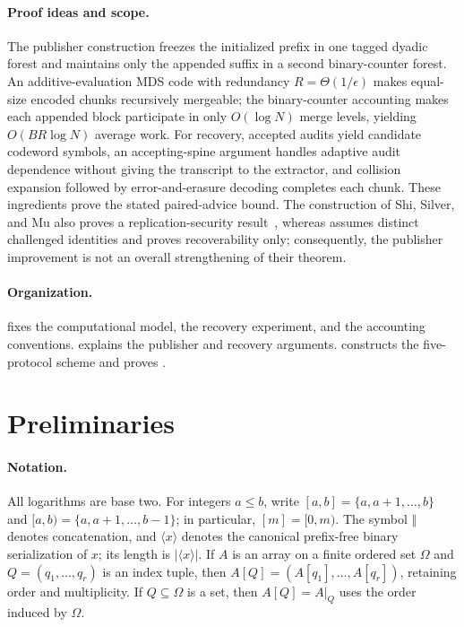 \documentclass[11pt]{article}
\begin{document}
\paragraph{Proof ideas and scope.}
The publisher construction freezes the initialized prefix in one tagged
dyadic forest and maintains only the appended suffix in a second binary-counter
forest.  An additive-evaluation MDS code with redundancy
$R=\Theta(1/\epsilon)$ makes equal-size encoded chunks recursively mergeable;
the binary-counter accounting makes each appended block participate in only
$O(\log N)$ merge levels, yielding $O(BR\log N)$ average work.  For recovery,
accepted audits yield candidate codeword symbols, an accepting-spine argument
handles adaptive audit dependence without giving the transcript to the
extractor, and collision expansion followed by error-and-erasure decoding
completes each chunk.  These ingredients prove the stated paired-advice bound.
The construction of Shi, Silver, and Mu also proves a replication-security
result~\cite{ShiSilverMu2026}, whereas
 assumes distinct challenged identities and proves
recoverability only; consequently, the publisher improvement is not an
overall strengthening of their theorem.

\paragraph{Organization.}
 fixes the computational model, the recovery
experiment, and the accounting conventions.   explains the
publisher and recovery arguments.   constructs the
five-protocol scheme and proves .

\section{Preliminaries}
\label{sec:preliminaries}

\paragraph{Notation.}
All logarithms are base two.  For integers $a\le b$, write
$[a,b]=\{a,a+1,\ldots,b\}$ and
$[a,b)=\{a,a+1,\ldots,b-1\}$; in particular, $[m]=[0,m)$.
The symbol $\Vert$ denotes concatenation, and $\langle x\rangle$ denotes the
canonical prefix-free binary serialization of $x$; its length is
$|\langle x\rangle|$.  If $A$ is an array on a finite ordered set $\Omega$
and $Q=(q_1,\ldots,q_r)$ is an index tuple, then
$A[Q]=(A[q_1],\ldots,A[q_r])$, retaining order and multiplicity.  If
$Q\subseteq\Omega$ is a set, then $A[Q]=A|_Q$ uses the order induced by
$\Omega$.
\end{document}
